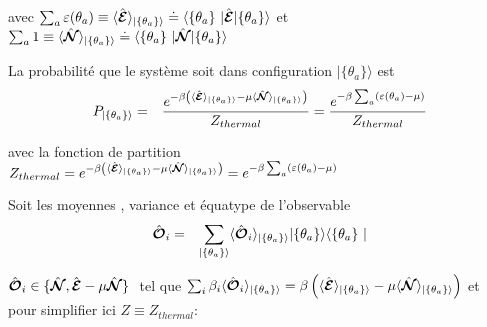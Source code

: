 	avec $  \sum_{a}  \varepsilon ( \theta_a ) \equiv \langle \operator{\mathcal{E}} \rangle_{\vert \{\theta_a \} \rangle}  \doteq  \langle \{ \theta_a \} \vert  \operator{ \mathcal{E}}  \vert \{ \theta_a\}\rangle $ et $\sum_a1  \equiv \langle \operator{\mathcal{N}} \rangle_{\vert \{\theta_a \} \rangle}  \doteq  \langle \{ \theta_a \} \vert  \operator{\mathcal{N}}  \vert \{ \theta_a\}\rangle $

	
	La probabilité que le système soit dans configuration $\vert \{ \theta_a \}\rangle $  est 
	\begin{eqnarray}
		P_{\vert \{\theta_a \} \rangle} & = & \frac{e^{- \beta \left ( \langle \hat{\bm{\mathcal{E}}} \rangle_{\vert \{\theta_a \} \rangle}   - \mu \langle \hat{\bm{\mathcal{N}}} \rangle_{\vert \{\theta_a \} \rangle} \right )}}{Z_{thermal}} = \frac{e^{- \beta \sum_a  ( \varepsilon( \theta_a )   - \mu  )}}{Z_{thermal}}	
	\end{eqnarray}
	
	avec la fonction de partition $Z_{thermal} = e^{- \beta \left ( \langle \hat{\bm{\mathcal{E}}} \rangle_{\vert \{\theta_a \} \rangle}   - \mu \langle \hat{\bm{\mathcal{N}}} \rangle_{\vert \{\theta_a \} \rangle} \right )} =  e^{- \beta \sum_a  ( \varepsilon( \theta_a )   - \mu  )}$
	
	Soit les moyennes , variance et équatype de l'observable 
	\begin{eqnarray}
		\operator{\mathcal{O}}_i & = & \sum_{\vert \{\theta_a \} \rangle} \langle \operator{\mathcal{O}}_i \rangle_{\vert \{\theta_a \} \rangle}  \vert \{ \theta_a\}\rangle	\langle \{ \theta_a \} \vert
	\end{eqnarray}
	
	$\operator{\mathcal{O}}_i \in \{\operator{\mathcal{N}} , \operator{\mathcal{E}} - \mu \operator{\mathcal{N}} \} $  tel que $\sum_i \beta_i \langle \hat{\bm{\mathcal{O}}}_i \rangle_{\vert \{\theta_a \} \rangle} = \beta \left ( \langle \hat{\bm{\mathcal{E}}} \rangle_{\vert \{\theta_a \} \rangle}   - \mu \langle \hat{\bm{\mathcal{N}}} \rangle_{\vert \{\theta_a \} \rangle} \right ) $ et pour simplifier ici $Z \equiv Z_{thermal}$:
	
